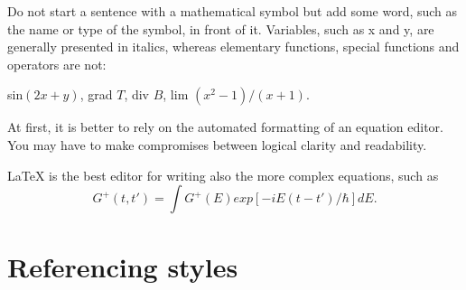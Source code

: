 \documentclass[12pt,a4paper,finnish]{tutthesis}
\begin{document}
Do not start a sentence with a mathematical symbol but add some word,
such as the name or type of the symbol, in front of it. Variables,
such as x and y, are generally presented in italics, whereas
elementary functions, special functions and operators are not:
\begin{center}
sin$(2x+y)$, 	grad $T$, 	div $B$, 	lim $(x^2 - 1)/(x + 1)$.
\end{center}

At first, it is better to rely on the automated formatting of an
equation editor. You may have to make compromises between logical
clarity and readability.


LaTeX is the best editor for writing also the more complex equations, such as
\begin{equation}
  \label{eq:fourier}
  G^+(t,t')= \int G^+(E) exp[-iE(t-t')/\hbar] dE.
\end{equation}



\chapter{Referencing styles}
\label{sec:ref_styles}




%
%
\end{document}
